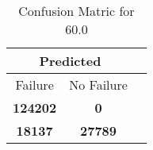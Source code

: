 \begin{table}[] 
\caption{Confusion Matric for 60.0} 
\label{Table: Prediction Accuracy-DMD60.0OnlySunEKF-resetReflectionperfectNoFailurePrediction-Reflection} 
\centering 
\begin{tabular} 
 {@{}ccc@{}} 
\toprule 
\multicolumn{2}{c}{\textbf{Predicted}}
 \\ \midrule 
\multicolumn{1}{|c|}{Failure} & 
\multicolumn{1}{c|}{No Failure}
 \\ \midrule 
\multicolumn{1}{|c|}{\color{green}\textbf{124202}} & 
\multicolumn{1}{c|}{\color{red}\textbf{0}}
 \\ \midrule 
\multicolumn{1}{|c|}{\color{red}\textbf{18137}} & 
\multicolumn{1}{c|}{\color{green}\textbf{27789}}
 \\ \bottomrule 
\end{tabular} 
\end{table} 
